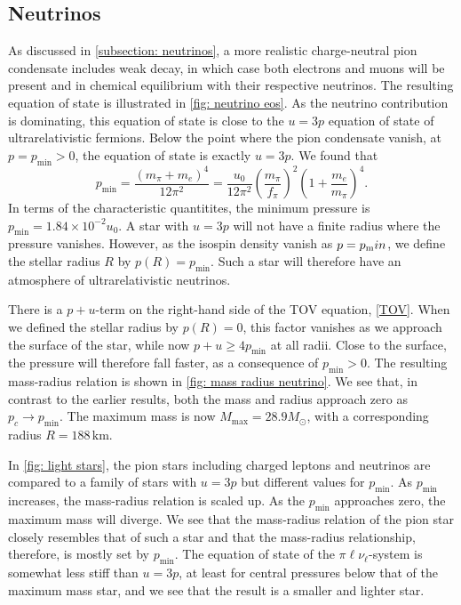\subsection{Neutrinos}

As discussed in \autoref{subsection: neutrinos}, a more realistic charge-neutral pion condensate includes weak decay, in which case both electrons and muons will be present and in chemical equilibrium with their respective neutrinos.
The resulting equation of state is illustrated in \autoref{fig: neutrino eos}.
As the neutrino contribution is dominating, this equation of state is close to the $u = 3p$ equation of state of ultrarelativistic fermions.
Below the point where the pion condensate vanish, at $p = p_\text{min}>0$, the equation of state is exactly $u = 3p$.
We found that
%
\begin{equation}
    p_\text{min} = \frac{(m_\pi + m_e)^4}{12\pi^2}
    = \frac{u_0}{12\pi^2} \left(\frac{m_\pi}{f_\pi}\right)^2 \left(1 + \frac{m_e}{m_\pi}\right)^4.
\end{equation}
%
In terms of the characteristic quantitites, the minimum pressure is $p_\text{min} = 1.84 \times 10^{-2} u_0$.
A star with $u = 3p$ will not have a finite radius where the pressure vanishes.
However, as the isospin density vanish as $p = p_\text min$, we define the stellar radius $R$ by $p(R) = p_\text{min}$.
Such a star will therefore have an atmosphere of ultrarelativistic neutrinos.

There is a $p+u$-term on the right-hand side of the TOV equation, \autoref{TOV}.
When we defined the stellar radius by $p(R) = 0$, this factor vanishes as we approach the surface of the star, while now $p+u \geq 4 p_\text{min}$ at all radii.
Close to the surface, the pressure will therefore fall faster, as a consequence of $p_\text{min}>0$.
The resulting mass-radius relation is shown in \autoref{fig: mass radius neutrino}.
We see that, in contrast to the earlier results, both the mass and radius approach zero as $p_c \rightarrow p_\text{min}$.
The maximum mass is now $M_\text{max} = 28.9 M_\odot$, with a corresponding radius $R = 188 \, \text{km}$.

In \autoref{fig: light stars}, the pion stars including charged leptons and neutrinos are compared to a family of stars with $u = 3p$ but different values for $p_\text{min}$.
As $p_\text{min}$ increases, the mass-radius relation is scaled up.
As the $p_\text{min}$ approaches zero, the maximum mass will diverge.
We see that the mass-radius relation of the pion star closely resembles that of such a star and that the mass-radius relationship, therefore, is mostly set by $p_\text{min}$.
The equation of state of the $\pi\ell\nu_\ell$-system is somewhat less stiff than $u = 3p$, at least for central pressures below that of the maximum mass star, and we see that the result is a smaller and lighter star.


